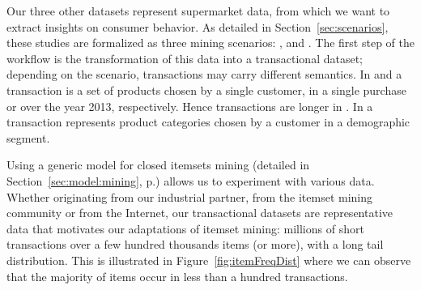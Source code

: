 %

Our three other datasets represent supermarket data,
from which we want to extract insights on consumer behavior.
As detailed in Section~\ref{sec:scenarios},
these studies are formalized as three mining scenarios:
\prodassocreceipt, \prodassocclient and \demoassoc.
The first step of the \datalyse workflow is the transformation of this data into a transactional dataset;
depending on the scenario, transactions may carry different semantics.
In \prodassocreceipt and \prodassocclient a transaction is a set of products chosen by a single customer,
in a single purchase or over the year 2013, respectively.
Hence transactions are longer in \prodassocclient.
In \demoassoc a transaction represents product categories chosen by a customer in a demographic segment.

%

Using a generic model for closed itemsets mining (detailed in Section~\ref{sec:model:mining}, p.\pageref{sec:model:mining})
allows us to experiment with various data.
Whether originating from our industrial partner, from the itemset mining community or from the Internet,
our transactional datasets are representative data
that motivates our adaptations of itemset mining:
millions of short transactions over a few hundred thousands items (or more), with a long tail distribution.
This is illustrated in Figure~\ref{fig:itemFreqDist}
where we can observe that the majority of items occur in less than a hundred transactions.

